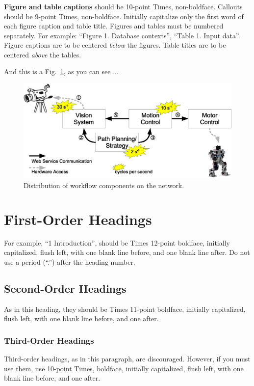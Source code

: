\documentclass[a4paper,twoside]{arlims}
\begin{document}
\textbf{Figure and table captions} should be 10-point Times,
non-boldface.  Callouts should be 9-point Times, non-boldface.
Initially capitalize only the first word of each figure caption and
table title. Figures and tables must be numbered separately. For
example: ``Figure 1.  Database contexts'', ``Table 1.  Input data''.
Figure captions are to be centered \emph{below} the figures. Table
titles are to be centered \emph{above} the tables.

And this is a Fig.~\ref{fig:timing}, as you can see ...

\begin{figure}[hbt]
  \centering
  \includegraphics[width=.5\textwidth]{timing}
  \caption{Distribution of workflow components on the network.}
  \label{fig:timing}
\end{figure}

\section{First-Order Headings}
\label{sect:FirstOrderHeadings}

For example, ``1 Introduction'', should be Times 12-point boldface,
initially capitalized, flush left, with one blank line before, and one
blank line after. Do not use a period (``.'') after the heading
number.

\subsection{Second-Order Headings}
\label{sect:SecondOrderHeadings}

As in this heading, they should be Times 11-point boldface, initially
capitalized, flush left, with one blank line before, and one after.

\subsubsection{Third-Order Headings}
\label{sect:ThirdOrderHeadings}

Third-order headings, as in this paragraph, are discouraged. However,
if you must use them, use 10-point Times, boldface, initially
capitalized, flush left, with one blank line before, and one after.
\end{document}
